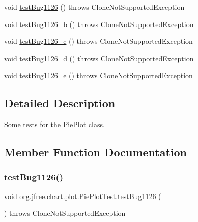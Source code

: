 \begin{DoxyCompactItemize}
\item 
void \mbox{\hyperlink{classorg_1_1jfree_1_1chart_1_1plot_1_1_pie_plot_test_ad98cc7d1ca1a885365b131b628178464}{test\+Bug1126}} ()  throws Clone\+Not\+Supported\+Exception 
\item 
void \mbox{\hyperlink{classorg_1_1jfree_1_1chart_1_1plot_1_1_pie_plot_test_a36b3b3280ad6d6cc58c5418df94fb2b8}{test\+Bug1126\+\_\+b}} ()  throws Clone\+Not\+Supported\+Exception 
\item 
void \mbox{\hyperlink{classorg_1_1jfree_1_1chart_1_1plot_1_1_pie_plot_test_a06048e86ce4fdb9ad369736485a229c7}{test\+Bug1126\+\_\+c}} ()  throws Clone\+Not\+Supported\+Exception 
\item 
void \mbox{\hyperlink{classorg_1_1jfree_1_1chart_1_1plot_1_1_pie_plot_test_a8b69faa034095f59b29fb4891f9bda74}{test\+Bug1126\+\_\+d}} ()  throws Clone\+Not\+Supported\+Exception 
\item 
void \mbox{\hyperlink{classorg_1_1jfree_1_1chart_1_1plot_1_1_pie_plot_test_ada0b320e618e832d27408cc46bed0a07}{test\+Bug1126\+\_\+e}} ()  throws Clone\+Not\+Supported\+Exception 
\end{DoxyCompactItemize}


\subsection{Detailed Description}
Some tests for the \mbox{\hyperlink{classorg_1_1jfree_1_1chart_1_1plot_1_1_pie_plot}{Pie\+Plot}} class. 

\subsection{Member Function Documentation}
\mbox{\label{classorg_1_1jfree_1_1chart_1_1plot_1_1_pie_plot_test_ad98cc7d1ca1a885365b131b628178464}} 
\subsubsection{\texorpdfstring{test\+Bug1126()}{testBug1126()}}
{\footnotesize\ttfamily void org.\+jfree.\+chart.\+plot.\+Pie\+Plot\+Test.\+test\+Bug1126 (\begin{DoxyParamCaption}{ }\end{DoxyParamCaption}) throws Clone\+Not\+Supported\+Exception}

